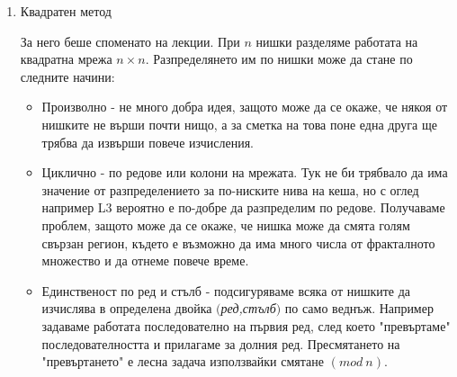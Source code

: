\begin{Large}
\begin{enumerate}{\theenumi}{}
 \hspace{1.5cm}
 
  \item Квадратен метод
  \par
  За него беше споменато на лекции. При $n$ нишки разделяме работата на квадратна мрежа $n \times n$. Разпределянето им по нишки може да стане по следните начини:
\begin{itemize}
\item Произволно - не много добра идея, защото може да се окаже, че някоя от нишките не върши почти нищо, а за сметка на това поне една друга ще трябва да извърши повече изчисления.


\item Циклично - по редове или колони на мрежата. Тук не би трябвало да има значение от разпределението за по-ниските нива на кеша, но с оглед например L3 вероятно е по-добре да разпределим по редове. Получаваме проблем, защото може да се окаже, че нишка може да смята голям свързан регион, където е възможно да има много числа от фракталното множество и да отнеме повече време.


\item Единственост по ред и стълб - подсигуряваме всяка от нишките да изчислява в определена двойка $($\textit{ред,стълб}$)$ по само веднъж. Например задаваме работата последователно на първия ред, след което "превъртаме" последователността и прилагаме за долния ред. Пресмятането на "превъртането" е лесна задача използвайки смятане $(mod \ n)$.


\end{itemize}
\end{enumerate}
\end{Large}
